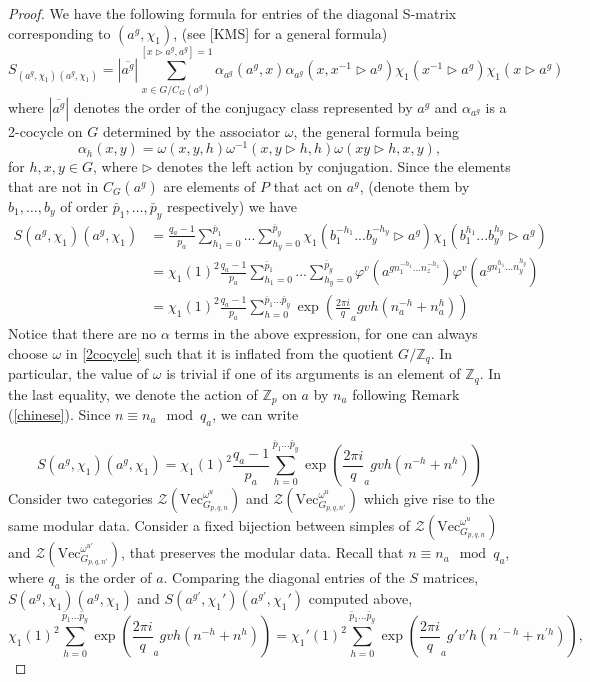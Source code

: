 \documentclass[11pt]{book}
\theoremstyle{Rem}
\theoremstyle{definition}
\numberwithin{equation}{section}
\newcommand\hit{\triangleright}
\newcommand\inv{^{-1}}
\newcommand\ZZ{\mathbb Z}
\newcommand{\pb}{\bar{p}}
\newcommand{\qb}{q_a}
\begin{document}
\begin{proof}
We have the following formula for entries of the diagonal S-matrix corresponding to $(a^g, \chi_1)$, (see [KMS] for a general formula)
\begin{equation}
	S_{(a^g, \chi_1)(a^g, \chi_1)} = |\overline{a^g}| \sum_{x\in G/C_G(a^g)}^{[x\hit a^g, a^g] = 1} \alpha_{a^g}(a^g, x)\alpha_{a^g}(x, x^{-1}\hit a^g)\chi_1(x^{-1}\hit a^g)\chi_1(x\hit a^g)
\end{equation}
where $|\overline{a^g}|$ denotes the order of the conjugacy class represented by $a^g$ and $\alpha_{a^g}$ is a 2-cocycle on $G$ determined by the associator $\omega$, the general formula being
\begin{equation}\label{2cocycle}
 	\alpha_h(x, y) = \omega(x, y, h)\omega\inv(x, y\hit h, h )\omega(xy\hit h, x, y),
 \end{equation} for $h, x, y \in G$, where $\hit$ denotes the left action by conjugation. Since the elements that are not in $C_G(a^g)$ are elements of $P$ that act on $a^g$, (denote them by $b_1,\dots,b_y$ of order $\pb_1,\dots,\pb_y $ respectively) we have
\begin{align}  
S(a^g, \chi_1)(a^g, \chi_1) &=  \frac{\qb-1}{p_a}\sum_{h_1=0}^{\pb_1}...\sum_{h_y=0}^{\pb_y}\chi_1(b_1^{-h_1}...b_y^{-h_y}\hit a^g)\chi_1(b_1^{h_1}...b_y^{h_y}\hit a^g)\nonumber\\
&=\chi_1(1)^2\frac{\qb-1}{p_a}\sum_{h_1=0}^{\pb_1}...\sum_{h_y=0}^{\pb_y}\varphi^v (a^{gn_1^{-h_1}\dots n_z^{-h_z}})\varphi^v( a^{gn_1^{h_1}\dots n_y^{h_y}})\nonumber\\
&=\chi_1(1)^2\frac{\qb-1}{p_a}\sum_{h=0}^{\pb_1...\pb_y}\exp(\frac{2\pi i}\qb gvh(n_a^{-h} +n_a^h))
\end{align}
Notice that there are no $\alpha$ terms in the above expression, for one can always choose $\omega$  in \ref{2cocycle} such that it is inflated from the quotient $G/\ZZ_q$. In particular, the value of $\omega$ is trivial if one of its arguments is an element of $\ZZ_q$.
In the last equality, we denote the action of $\ZZ_p$ on $a$ by $n_a$ following Remark (\ref{chinese}).  Since $n\equiv n_a\mod \qb$, we can write

\begin{equation}
	S(a^g, \chi_1)(a^g, \chi_1) =\chi_1(1)^2\frac{\qb-1}{p_a}\sum_{h=0}^{\pb_1...\pb_y}\exp(\frac{2\pi i}\qb gvh(n^{-h} +n^h))
\end{equation}
Consider two categories $\mathcal{Z}(\text{Vec}^{\omega^{u}}_{G_{p,q,n}})$ and $\mathcal{Z}(\text{Vec}^{\omega^u}_{G_{p,q,n'}})$ which give rise to the same modular data. Consider a fixed bijection between simples of $\mathcal{Z}(\text{Vec}^{\omega^u}_{G_{p, q, n}})$ and $\mathcal{Z}(\text{Vec}^{\omega^{u'}}_{G_{p,q,n'}})$, that preserves the modular data.  Recall that $n\equiv n_a \mod \qb$, where $\qb$ is the order of $a$. Comparing the diagonal entries of the $S$ matrices, $S(a^g, \chi_1)(a^g, \chi_1)$ and $S(a^{g'}, \chi_1')(a^{g'}, \chi_1')$ computed above,
\begin{equation}
 	\chi_1(1)^2\sum_{h=0}^{\pb_1...\pb_y}\exp(\frac{2\pi i}\qb gvh(n^{-h} +n^h)) = \chi_1'(1)^2\sum_{h=0}^{\pb_1...\pb_y}\exp(\frac{2\pi i}\qb g'v'h(n^{\prime-h} +n^{\prime h})),
 \end{equation}


\end{proof}
\end{document}
